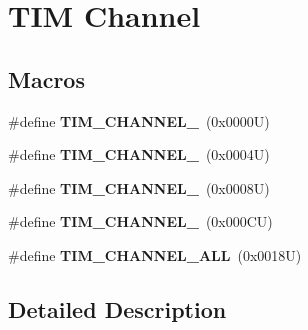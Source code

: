 \hypertarget{group___t_i_m___channel}{}\section{T\+IM Channel}
\label{group___t_i_m___channel}
\subsection*{Macros}
\begin{DoxyCompactItemize}
\item 
\mbox{\label{group___t_i_m___channel_ga6b1541e4a49d62610899e24bf23f4879}} 
\#define {\bfseries T\+I\+M\+\_\+\+C\+H\+A\+N\+N\+E\+L\+\_}~(0x0000\+U)
\item 
\mbox{\label{group___t_i_m___channel_ga33e02d43345a7ac5886f01b39e4f7ccd}} 
\#define {\bfseries T\+I\+M\+\_\+\+C\+H\+A\+N\+N\+E\+L\+\_}~(0x0004\+U)
\item 
\mbox{\label{group___t_i_m___channel_ga4ea100c1789b178f3cb46721b7257e2d}} 
\#define {\bfseries T\+I\+M\+\_\+\+C\+H\+A\+N\+N\+E\+L\+\_}~(0x0008\+U)
\item 
\mbox{\label{group___t_i_m___channel_gad59ef74820ee8bf77fa1f8d589fde2ac}} 
\#define {\bfseries T\+I\+M\+\_\+\+C\+H\+A\+N\+N\+E\+L\+\_}~(0x000\+C\+U)
\item 
\mbox{\label{group___t_i_m___channel_ga6abf8f9fc695b79d8781ca082dfb48bc}} 
\#define {\bfseries T\+I\+M\+\_\+\+C\+H\+A\+N\+N\+E\+L\+\_\+\+A\+LL}~(0x0018\+U)
\end{DoxyCompactItemize}


\subsection{Detailed Description}
